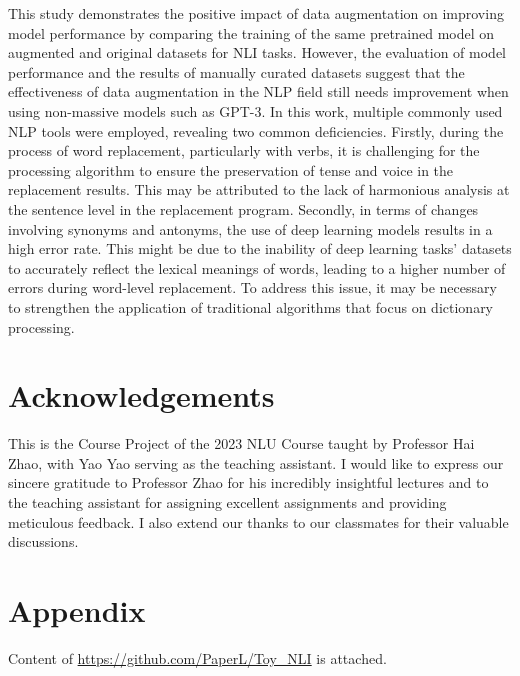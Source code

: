 \documentclass[11pt]{article}
\begin{document}
This study demonstrates the positive impact of data augmentation on improving model performance by comparing the training of the same pretrained model on augmented and original datasets for NLI tasks. However, the evaluation of model performance and the results of manually curated datasets suggest that the effectiveness of data augmentation in the NLP field still needs improvement when using non-massive models such as GPT-3. In this work, multiple commonly used NLP tools were employed, revealing two common deficiencies. Firstly, during the process of word replacement, particularly with verbs, it is challenging for the processing algorithm to ensure the preservation of tense and voice in the replacement results. This may be attributed to the lack of harmonious analysis at the sentence level in the replacement program. Secondly, in terms of changes involving synonyms and antonyms, the use of deep learning models results in a high error rate. This might be due to the inability of deep learning tasks' datasets to accurately reflect the lexical meanings of words, leading to a higher number of errors during word-level replacement. To address this issue, it may be necessary to strengthen the application of traditional algorithms that focus on dictionary processing.

\section*{Acknowledgements}
This is the Course Project of the 2023 NLU Course taught by Professor Hai Zhao, with Yao Yao serving as the teaching assistant. I would like to express our sincere gratitude to Professor Zhao for his incredibly insightful lectures and to the teaching assistant for assigning excellent assignments and providing meticulous feedback. I also extend our thanks to our classmates for their valuable discussions.





\appendix

\section{Appendix}
\label{sec:appendix}

Content of \url{https://github.com/PaperL/Toy_NLI} is attached.
\end{document}
